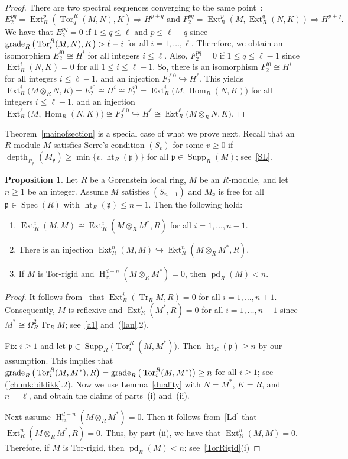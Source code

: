 \documentclass[11pt]{amsart}
\theoremstyle{definition}
\newtheorem{prop}[thm]{Proposition}
\theoremstyle{definition}
\numberwithin{equation}{section}
\newcommand{\fm}{\mathfrak{m}}
\newcommand{\fp}{\mathfrak{p}}
\DeclareMathOperator{\gr}{\textnormal{grade}}
\DeclareMathOperator{\Tr}{Tr}
\DeclareMathOperator{\depth}{depth}
\DeclareMathOperator{\Ext}{Ext}
\DeclareMathOperator{\Ht}{ht}
\DeclareMathOperator{\hh}{H}
\DeclareMathOperator{\Hom}{Hom}
\DeclareMathOperator{\pd}{pd}
\DeclareMathOperator{\Supp}{Supp}
\DeclareMathOperator{\Spec}{Spec}
\DeclareMathOperator{\Tor}{Tor}
\begin{document}
\begin{proof} There are two spectral sequences converging to the same point~\cite[10.62 and 10.64]{Roit}:
$$E_2^{pq}=\Ext^p_R(\Tor_q^R(M,N),K) \Longrightarrow H^{p+q} \text{ and }
F_2^{pq}=\Ext^p_R(M,\Ext^q_R(N,K)) \Longrightarrow H^{p+q}.$$
We have that $E_2^{pq}=0$ if $1\leq q\leq \ell$ and $p\leq \ell-q$ since $\gr_R\big(\Tor_i^R(M,N),K\big)>\ell-i$ for all $i=1, \ldots, \ell$. Therefore, we obtain an isomorphism $E_2^{i0}\cong H^i$ for all integers $i\le \ell$. Also, $F_2^{pq}=0$ if $1\le q\le \ell-1$ since $\Ext^i_R(N,K)=0$ for all $1\le i\le \ell-1$. So, there is an isomorphism $F_2^{i0}\cong H^i$ for all integers $i\le \ell-1$, and an injection $F_2^{\ell0}\hookrightarrow H^\ell$. This yields $\Ext^i_R\big(M\otimes_R N,K\big)=E_2^{i0}\cong H^i\cong F_2^{i0}=\Ext^i_R\big(M,\Hom_R(N,K)\big)$ for all integers $i\le \ell-1$, and an injection $\Ext^\ell_R\big(M,\Hom_R(N,K)\big)\cong F_2^{\ell0}\hookrightarrow H^\ell\cong\Ext^\ell_R\big(M\otimes_RN,K\big)$.
\end{proof}

Theorem~\ref{mainofsection} is a special case of what we prove next. Recall that an $R$-module $M$ satisfies Serre's condition $(S_{v})$ for some $v\geq 0$ if $\depth_{R_{\fp}}(M_\fp)\geq\min\big\{v,\Ht_R(\fp)\big\}$ for all $\fp\in\Supp_R(M)$; see~\ref{SL}.

\begin{prop}\label{ll} Let $R$ be a Gorenstein local ring, $M$ be an $R$-module, and let $n\geq 1$ be an integer. Assume $M$ satisfies $(S_{n+1})$ and $M_{\fp}$ is free for all $\fp \in \Spec(R)$ with $\Ht_R(\fp)\leq n-1$. Then the following hold:
\begin{enumerate}[\rm(i)]
\item $\Ext^i_R(M,M)\cong\Ext^i_R(M\otimes_RM^*,R)$ for all $i=1, \ldots, n-1$.
\item There is an injection $\Ext^n_{R}(M,M)\hookrightarrow\Ext^n_R(M\otimes_RM^*,R)$.
\item If $M$ is Tor-rigid and $\hh^{d-n}_{\fm}(M\otimes_RM^*)=0$, then $\pd_R(M)<n$.
\end{enumerate}
\end{prop}

\begin{proof} It follows from~\cite[4.25]{AuBr} that $\Ext^i_R(\Tr_R M,R)=0$ for all $i=1, \ldots, n+1$. Consequently, $M$ is reflexive and $\Ext^i_R(M^*,R)=0$ for all $i=1, \ldots, n-1$ since $M^{\ast} \cong \Omega^2_R \Tr_R M$; see~\ref{a1} and~(\ref{lan}.2). 

Fix $i\geq 1$ and let $\fp \in \Supp_R\big(\Tor_i^R(M,M^*)\big)$. Then $\Ht_R(\fp)\geq n$ by our assumption. This implies that $\gr_R\big(\Tor_i^R(M,M^*),R\big)=\gr_R\big(\Tor_i^R(M,M^*)\big)\geq n$ for all $i\geq 1$; see (\ref{chunk:bildikk}.2). Now we use Lemma~\ref{duality} with $N=M^{\ast}$, $K=R$, and $n=\ell$, and obtain the claims of parts~(i) and~(ii).

Next assume $\hh^{d-n}_{\fm}(M\otimes_RM^*)=0$. Then it follows from~\ref{Ld} that $\Ext^n_R(M\otimes_RM^{\ast},R)=0$. Thus, by part (ii), we have that  $\Ext^n_R(M,M)=0$. Therefore, if $M$ is Tor-rigid, then $\pd_R(M)<n$; see~\ref{TorRigid}(i)
\end{proof}
\end{document}
